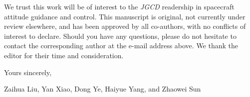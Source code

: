 \documentclass[12pt]{article}
\begin{document}
We trust this work will be of interest to the \textit{JGCD} readership in
spacecraft attitude guidance and control. This manuscript is original, not
currently under review elsewhere, and has been approved by all co-authors,
with no conflicts of interest to declare. Should you have any questions,
please do not hesitate to contact the corresponding author at the e-mail
address above. We thank the editor for their time and consideration.

Yours sincerely,

\bigskip\bigskip

Zaihua Liu, Yan Xiao, Dong Ye, Haiyue Yang, and Zhaowei Sun
\end{document}
